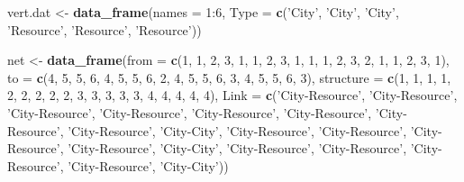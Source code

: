 \documentclass[]{article}
\newenvironment{Shaded}{}{}
\newcommand{\KeywordTok}[1]{\textcolor[rgb]{0.00,0.44,0.13}{\textbf{{#1}}}}
\newcommand{\DataTypeTok}[1]{\textcolor[rgb]{0.56,0.13,0.00}{{#1}}}
\newcommand{\DecValTok}[1]{\textcolor[rgb]{0.25,0.63,0.44}{{#1}}}
\newcommand{\StringTok}[1]{\textcolor[rgb]{0.25,0.44,0.63}{{#1}}}
\newcommand{\NormalTok}[1]{{#1}}
\begin{document}
\begin{Shaded}
\begin{Highlighting}[]
\NormalTok{vert.dat <-}\StringTok{ }\KeywordTok{data_frame}\NormalTok{(}\DataTypeTok{names =} \DecValTok{1}\NormalTok{:}\DecValTok{6}\NormalTok{, }\DataTypeTok{Type =} \KeywordTok{c}\NormalTok{(}\StringTok{'City'}\NormalTok{, }\StringTok{'City'}\NormalTok{, }\StringTok{'City'}\NormalTok{, }\StringTok{'Resource'}\NormalTok{, }\StringTok{'Resource'}\NormalTok{, }\StringTok{'Resource'}\NormalTok{))}

\NormalTok{net <-}\StringTok{ }\KeywordTok{data_frame}\NormalTok{(}\DataTypeTok{from =} \KeywordTok{c}\NormalTok{(}\DecValTok{1}\NormalTok{, }\DecValTok{1}\NormalTok{, }\DecValTok{2}\NormalTok{, }\DecValTok{3}\NormalTok{, }\DecValTok{1}\NormalTok{, }\DecValTok{1}\NormalTok{, }\DecValTok{2}\NormalTok{, }\DecValTok{3}\NormalTok{, }\DecValTok{1}\NormalTok{, }\DecValTok{1}\NormalTok{, }\DecValTok{1}\NormalTok{, }\DecValTok{2}\NormalTok{, }\DecValTok{3}\NormalTok{, }\DecValTok{2}\NormalTok{, }\DecValTok{1}\NormalTok{, }\DecValTok{1}\NormalTok{, }\DecValTok{2}\NormalTok{, }\DecValTok{3}\NormalTok{, }\DecValTok{1}\NormalTok{),}
           \DataTypeTok{to =} \KeywordTok{c}\NormalTok{(}\DecValTok{4}\NormalTok{, }\DecValTok{5}\NormalTok{, }\DecValTok{5}\NormalTok{, }\DecValTok{6}\NormalTok{, }\DecValTok{4}\NormalTok{, }\DecValTok{5}\NormalTok{, }\DecValTok{5}\NormalTok{, }\DecValTok{6}\NormalTok{, }\DecValTok{2}\NormalTok{, }\DecValTok{4}\NormalTok{, }\DecValTok{5}\NormalTok{, }\DecValTok{5}\NormalTok{, }\DecValTok{6}\NormalTok{, }\DecValTok{3}\NormalTok{, }\DecValTok{4}\NormalTok{, }\DecValTok{5}\NormalTok{, }\DecValTok{5}\NormalTok{, }\DecValTok{6}\NormalTok{, }\DecValTok{3}\NormalTok{), }
           \DataTypeTok{structure =} \KeywordTok{c}\NormalTok{(}\DecValTok{1}\NormalTok{, }\DecValTok{1}\NormalTok{, }\DecValTok{1}\NormalTok{, }\DecValTok{1}\NormalTok{, }\DecValTok{2}\NormalTok{, }\DecValTok{2}\NormalTok{, }\DecValTok{2}\NormalTok{, }\DecValTok{2}\NormalTok{, }\DecValTok{2}\NormalTok{, }\DecValTok{3}\NormalTok{, }\DecValTok{3}\NormalTok{, }\DecValTok{3}\NormalTok{, }\DecValTok{3}\NormalTok{, }\DecValTok{3}\NormalTok{, }\DecValTok{4}\NormalTok{, }\DecValTok{4}\NormalTok{, }\DecValTok{4}\NormalTok{, }\DecValTok{4}\NormalTok{, }\DecValTok{4}\NormalTok{),}
           \DataTypeTok{Link =} \KeywordTok{c}\NormalTok{(}\StringTok{'City-Resource'}\NormalTok{, }\StringTok{'City-Resource'}\NormalTok{, }\StringTok{'City-Resource'}\NormalTok{, }\StringTok{'City-Resource'}\NormalTok{, }\StringTok{'City-Resource'}\NormalTok{, }\StringTok{'City-Resource'}\NormalTok{, }\StringTok{'City-Resource'}\NormalTok{, }\StringTok{'City-Resource'}\NormalTok{, }\StringTok{'City-City'}\NormalTok{, }\StringTok{'City-Resource'}\NormalTok{, }\StringTok{'City-Resource'}\NormalTok{, }\StringTok{'City-Resource'}\NormalTok{, }\StringTok{'City-Resource'}\NormalTok{, }\StringTok{'City-City'}\NormalTok{, }\StringTok{'City-Resource'}\NormalTok{, }\StringTok{'City-Resource'}\NormalTok{, }\StringTok{'City-Resource'}\NormalTok{, }\StringTok{'City-Resource'}\NormalTok{, }\StringTok{'City-City'}\NormalTok{)) %
}
\end{Highlighting}
\end{Shaded}
\end{document}
